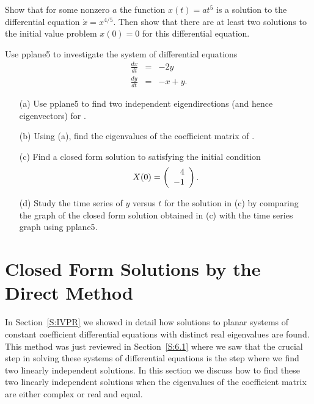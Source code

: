 \begin{exercise}  \label{c6.1.4A}
Show that for some nonzero $a$ the function $x(t)=at^5$ is a solution to the
differential equation $\dot{x}=x^{4/5}$.  Then show that there are at least
two solutions to the initial value problem $x(0)=0$ for this differential
equation.
\end{exercise}


\CEXER

\begin{exercise} \label{c6.1.4}
Use {\sf pplane5} to investigate the system
of differential equations
\begin{equation}  \label{Ex.1.4}
\begin{array}{rcr}
\frac{dx}{dt}  & = & -2y \\
\frac{dy}{dt}  & = &  -x+y.
\end{array}
\end{equation}
\begin{itemize}
\item[(a)] Use {\sf pplane5} to find two independent eigendirections (and
hence eigenvectors) for .
\item[(b)] Using (a), find the eigenvalues of the coefficient matrix of
.
\item[(c)] Find a closed form solution to  satisfying the initial
condition
\[
X(0) = \left(\begin{array}{r} 4 \\ -1\end{array}\right).
\]
\item[(d)] Study the time series of $y$ versus $t$ for the solution in (c)
by comparing the graph of the closed form solution obtained in (c) with the
time series graph using {\sf pplane5}.
\end{itemize}
\end{exercise}




\section{Closed Form Solutions by the Direct Method}
\label{S:TDM}


In Section~\ref{S:IVPR} we showed in detail how solutions to planar systems
of constant coefficient differential equations with distinct real eigenvalues
are found.  This method was just reviewed in Section~\ref{S:6.1} where we saw
that the crucial step in solving these systems of differential equations is
the step where we find two linearly independent solutions.   In this section
we discuss how to find these two linearly independent solutions when the
eigenvalues of the coefficient matrix are either complex or real and equal.


